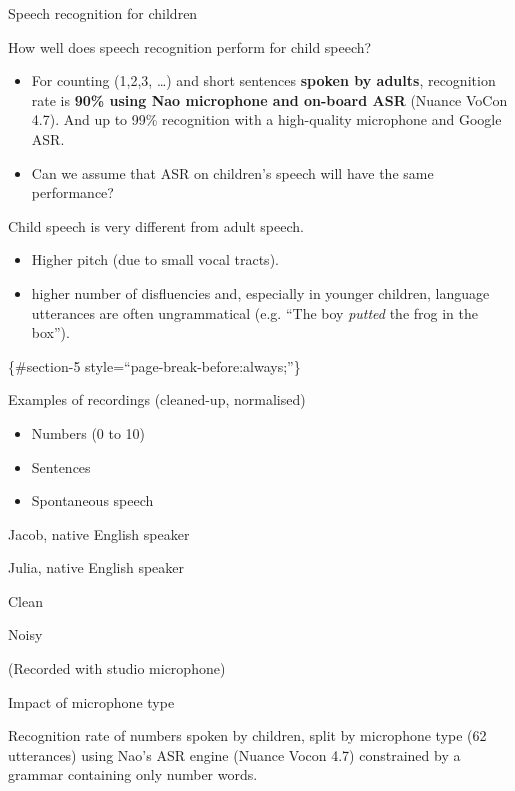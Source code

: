 \documentclass[compress]{beamer}
\providecommand{\tightlist}{%
  \setlength{\itemsep}{0pt}\setlength{\parskip}{0pt}}
\begin{document}
\begin{frame}{Speech recognition for children}

How well does speech recognition perform for child speech?

\begin{itemize}
\tightlist
\item
  For counting (1,2,3, \ldots{}) and short sentences \textbf{spoken by
  adults}, recognition rate is \textbf{90\% using Nao microphone and
  on-board ASR} (Nuance VoCon 4.7). And up to 99\% recognition with a
  high-quality microphone and Google ASR.
\item
  Can we assume that ASR on children's speech will have the same
  performance?
\end{itemize}

Child speech is very different from adult speech.

\begin{itemize}
\tightlist
\item
  Higher pitch (due to small vocal tracts).
\item
  higher number of disfluencies and, especially in younger children,
  language utterances are often ungrammatical (e.g. ``The boy
  \emph{putted} the frog in the box'').
\end{itemize}

\{\#section-5 style=``page-break-before:always;''\}

\end{frame}

\begin{frame}{Examples of recordings (cleaned-up, normalised)}

\begin{itemize}
\tightlist
\item
  Numbers (0 to 10)
\item
  Sentences
\item
  Spontaneous speech
\end{itemize}

Jacob, native English speaker

Julia, native English speaker

Clean

Noisy

(Recorded with studio microphone)

\end{frame}

\begin{frame}{Impact of microphone type}

Recognition rate of numbers spoken by children, split by microphone type
(62 utterances) using Nao's ASR engine (Nuance Vocon 4.7) constrained by
a grammar containing only number words.

\end{frame}
\end{document}
